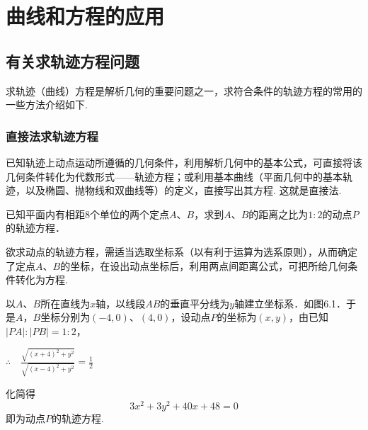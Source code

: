 \chapter{曲线和方程的应用}
\section{有关求轨迹方程问题}
求轨迹（曲线）方程是解析几何的重要问题之一，求符合条件的轨迹方程的常用的一些方法介绍如下.

\subsection{直接法求轨迹方程}
已知轨迹上动点运动所遵循的几何条件，利用解析几何中的基本公式，可直接将该几何条件转化为代数形式——轨迹方程；或利用基本曲线（平面几何中的基本轨迹，以及椭圆、抛物线和双曲线等）的定义，直接写出其方程. 这就是直接法.

\begin{example}
    已知平面内有相距8个单位的两个定点$A$、$B$，求到$A$、$B$的距离之比为$1:2$的动点$P$的轨迹方程．
\end{example}

\begin{analyze}
    欲求动点的轨迹方程，需适当选取坐标系（以有利于运算为选系原则），从而确定了定点$A$、$B$的坐标，在设出动点坐标后，利用两点间距离公式，可把所给几何条件转化为方程.
\end{analyze}

\noindent
\begin{minipage}{.47\textwidth}\CTEXindent
\begin{solution}
    以$A$、$B$所在直线为$x$轴，以线段$AB$的垂直平分线为$y$轴建立坐标系．如图6.1．于是$A$，$B$坐标分别为$(-4,0)$、$(4,0)$，设动点$P$的坐标为$(x,y)$，由已知$|PA|:|PB|=1:2$，

    $\therefore\quad \frac{\sqrt{(x+4)^2+y^2}}{\sqrt{(x-4)^2+y^2}}=\frac{1}{2}$

化简得
\[3x^2+3y^2+40x+48=0\]
即为动点$P$的轨迹方程.
\end{solution}
\end{minipage}\hfill
\begin{minipage}{.5\textwidth}
    \centering
{}    
\end{minipage}




